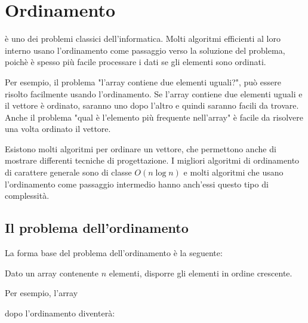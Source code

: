\chapter{Ordinamento}


è uno dei problemi classici dell'informatica.
Molti algoritmi efficienti 
al loro interno usano l'ordinamento come
passaggio verso la soluzione del problema,
poichè è spesso più facile processare i dati
se gli elementi sono ordinati. 

Per esempio, il problema "l'array contiene due elementi uguali?",
può essere risolto facilmente usando l'ordinamento.
Se l'array contiene due elementi uguali
e il vettore è ordinato, saranno uno dopo l'altro e 
quindi saranno facili da trovare.
Anche il problema "qual è l'elemento più frequente nell'array"
è facile da risolvere una volta ordinato il vettore.

Esistono molti algoritmi per ordinare un vettore, che
permettono anche di mostrare differenti 
tecniche di progettazione.
I migliori algoritmi di ordinamento di carattere generale
sono di classe $O(n \log n)$ e molti
algoritmi che usano l'ordinamento come passaggio
intermedio hanno anch'essi questo tipo di complessità. 

\section{Il problema dell'ordinamento}

La forma base del problema dell'ordinamento  è la seguente:
\begin{framed}
\noindent
Dato un array contenente $n$ elementi, 
disporre gli elementi in ordine crescente.
\end{framed}
\noindent
Per esempio, l'array
\begin{center}
\end{center}
dopo l'ordinamento diventerà:
\begin{center}
\end{center}


